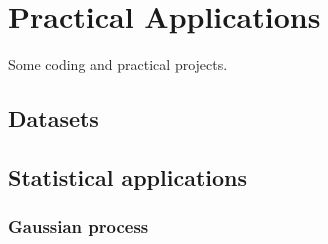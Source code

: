 \chapter{Practical Applications}
Some coding and practical projects.

\section{Datasets}


\section{Statistical applications}

\subsection{Gaussian process}
